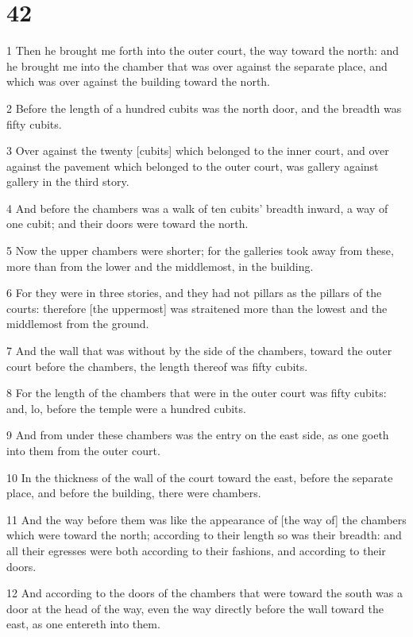 \chapter{42}

\par 1 Then he brought me forth into the outer court, the way toward the north: and he brought me into the chamber that was over against the separate place, and which was over against the building toward the north.
\par 2 Before the length of a hundred cubits was the north door, and the breadth was fifty cubits.
\par 3 Over against the twenty [cubits] which belonged to the inner court, and over against the pavement which belonged to the outer court, was gallery against gallery in the third story.
\par 4 And before the chambers was a walk of ten cubits' breadth inward, a way of one cubit; and their doors were toward the north.
\par 5 Now the upper chambers were shorter; for the galleries took away from these, more than from the lower and the middlemost, in the building.
\par 6 For they were in three stories, and they had not pillars as the pillars of the courts: therefore [the uppermost] was straitened more than the lowest and the middlemost from the ground.
\par 7 And the wall that was without by the side of the chambers, toward the outer court before the chambers, the length thereof was fifty cubits.
\par 8 For the length of the chambers that were in the outer court was fifty cubits: and, lo, before the temple were a hundred cubits.
\par 9 And from under these chambers was the entry on the east side, as one goeth into them from the outer court.
\par 10 In the thickness of the wall of the court toward the east, before the separate place, and before the building, there were chambers.
\par 11 And the way before them was like the appearance of [the way of] the chambers which were toward the north; according to their length so was their breadth: and all their egresses were both according to their fashions, and according to their doors.
\par 12 And according to the doors of the chambers that were toward the south was a door at the head of the way, even the way directly before the wall toward the east, as one entereth into them.
